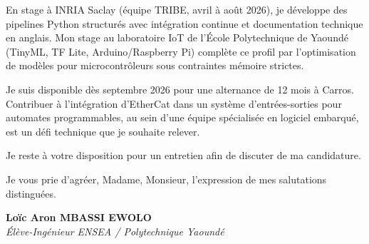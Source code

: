 \documentclass[a4paper,11pt]{article}
\begin{document}
En stage à INRIA Saclay (équipe TRIBE, avril à août 2026), je développe des pipelines Python structurés avec intégration continue et documentation technique en anglais. Mon stage au laboratoire IoT de l'École Polytechnique de Yaoundé (TinyML, TF Lite, Arduino/Raspberry Pi) complète ce profil par l'optimisation de modèles pour microcontrôleurs sous contraintes mémoire strictes.

Je suis disponible dès septembre 2026 pour une alternance de 12 mois à Carros. Contribuer à l'intégration d'EtherCat dans un système d'entrées-sorties pour automates programmables, au sein d'une équipe spécialisée en logiciel embarqué, est un défi technique que je souhaite relever.

Je reste à votre disposition pour un entretien afin de discuter de ma candidature.

Je vous prie d'agréer, Madame, Monsieur, l'expression de mes salutations distinguées.

\vspace{0.8cm}

\textbf{Loïc Aron MBASSI EWOLO}\\
\textit{Élève-Ingénieur ENSEA / Polytechnique Yaoundé}
\end{document}
